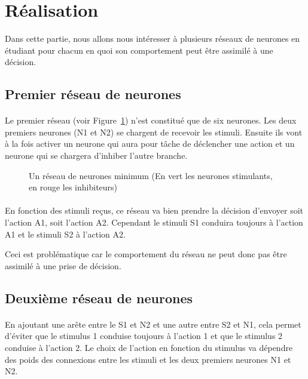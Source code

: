 \section{Réalisation}
Dans cette partie, nous allons nous intéresser à plusieurs réseaux de neurones
en étudiant pour chacun en quoi son comportement peut être assimilé à une 
décision.


\subsection{Premier réseau de neurones}
\paragraph{}
Le premier réseau (voir Figure~\ref{reseau1}) n'est constitué que de six
neurones. Les deux
premiers neurones (N1 et N2) se chargent de recevoir les stimuli. Ensuite ils 
vont à la fois activer un neurone qui aura pour tâche de déclencher une 
action et un neurone qui se chargera d'inhiber l'autre branche. 

\begin{figure}[!h]
  \begin{center}
    
  \end{center}
  \caption{Un réseau de neurones minimum (En vert les neurones stimulants, en rouge les inhibiteurs)}
  \label{reseau1}
\end{figure}

\paragraph{}
En fonction des stimuli reçus, ce réseau va bien prendre la décision 
d'envoyer soit l'action A1, soit l'action A2. Cependant le 
stimuli S1 conduira toujours à l'action A1 et le stimuli S2 à 
l'action A2.

Ceci est problématique car le comportement du réseau ne peut donc pas 
être assimilé à une prise de décision.

\subsection{Deuxième réseau de neurones}
\paragraph{}
En ajoutant une arête entre le S1 et N2 et une autre entre S2 et N1, cela
permet d'éviter que le stimulus 1 conduise toujours à l'action 1 et que le
stimulus 2 conduise à l'action 2. Le choix de l'action en fonction du stimulus
va dépendre des poids des connexions entre les stimuli et les deux premiers
neurones N1 et N2.

